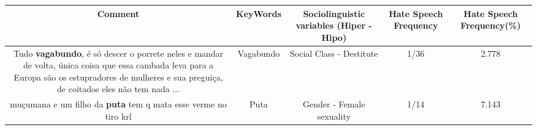 \documentclass[11pt]{article}
\newlength\mylength
\begin{document}
\begin{center}
\setlength\mylength{\dimexpr\textwidth - 1\arrayrulewidth - 50\tabcolsep}
\begin{longtable}{|C{.65\mylength}|C{.30\mylength}|C{.12\mylength}|C{.12\mylength}|C{.12\mylength}|}
\hline
\textbf{Comment} & \textbf{KeyWords} & \textbf{Sociolinguistic variables (Hiper - Hipo)}  & \textbf{Hate Speech Frequency} & \textbf{Hate Speech Frequency(\%)} \\
\hline{}\small Tudo \textbf{vagabundo}, é só descer o porrete neles e mandar de volta, única coisa que essa cambada leva para a Europa são os estupradores de mulheres e sua preguiça, de coitados eles não tem nada ...\normalsize   & Vagabundo & Social Class - Destitute & 1/36 & 2.778 \\  \hline
  \small muçumana e um filho da \textbf{puta} tem q mata esse verme no tiro krl\normalsize   & Puta & Gender - Female sexuality & 1/14 & 7.143 \\  \hline

\end{longtable}
\end{center}
\end{document}
